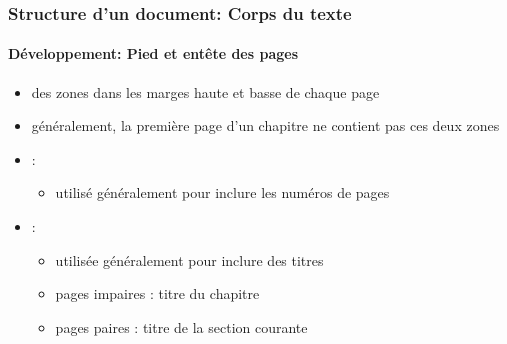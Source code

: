 \documentclass[xcolor=table]{beamer}
\begin{document}
\begin{frame}
\frametitle{Structure d'un document: Corps du texte}
\framesubtitle{Développement: Pied et entête des pages}

\begin{minipage}{0.60\textwidth}
	\begin{itemize}
		\item des zones dans les marges haute et basse de chaque page 
		\item généralement, la première page d'un chapitre ne contient pas ces deux zones 
		\item {}: 
		\begin{itemize}
			\item utilisé généralement pour inclure les numéros de pages
		\end{itemize}
		
		\item {}: 
		\begin{itemize}
			\item utilisée généralement pour inclure des titres
			\item pages impaires : titre du chapitre
			\item pages paires : titre de la section courante
		\end{itemize}
	\end{itemize}
\end{minipage}
\begin{minipage}{0.38\textwidth}
\end{minipage}

\end{frame}
\end{document}
